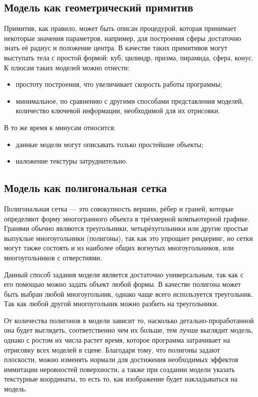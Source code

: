 \documentclass[12pt,a4paper,oneside]{report}
\begin{document}
	\subsection{Модель как геометрический примитив}
	 \quad Примитив, как правило, может быть описан процедурой, которая принимает некоторые значения параметров, например, для построения сферы достаточно знать её радиус и положение центра. В качестве таких примитивов могут выступать тела с простой формой: куб, цилиндр, призма, пирамида, сфера, конус.\\
	
	К плюсам таких моделей можно отнести:
	\begin{itemize}
		\item простоту построения, что увеличивает скорость работы программы;
		\item минимальное, по сравнению с другими способами представления моделей, количество ключевой информации, необходимой для их отрисовки.
	\end{itemize}
	
	В то же время к минусам относится:
	\begin{itemize}
		\item данные модели могут описывать только простейшие объекты;
		\item наложение текстуры затруднительно.
	\end{itemize}

	\subsection{Модель как полигональная сетка}
	 \quad Полигональная сетка — это совокупность вершин, рёбер и граней, которые определяют форму многогранного объекта в трёхмерной компьютерной графике. Гранями обычно являются треугольники, четырёхугольники или другие простые выпуклые многоугольники (полигоны), так как это упрощает рендеринг, но сетки могут также состоять и из наиболее общих вогнутых многоугольников, или многоугольников с отверстиями.
	 
	 Данный способ задания модели является достаточно универсальным, так как с его помощью можно задать объект любой формы. В качестве полигона может быть выбран любой многоугольник, однако чаще всего используется треугольник. Так как любой другой многоугольник можно разбить на треугольники.
	
	 От количества полигонов в модели зависит то, насколько детально-проработанной она будет выглядеть, соответственно чем их больше, тем лучше выглядит модель, однако с ростом их числа растет время, которое программа затрачивает на отрисовку всех моделей в сцене.
	 Благодаря тому, что полигоны задают плоскости, можно изменять нормали для достижения необходимых эффектов иммитации неровностей поверхности, а также при создании модели указать текстурные координаты, то есть то, как изображение будет накладываться на модель.
	
\end{document}

